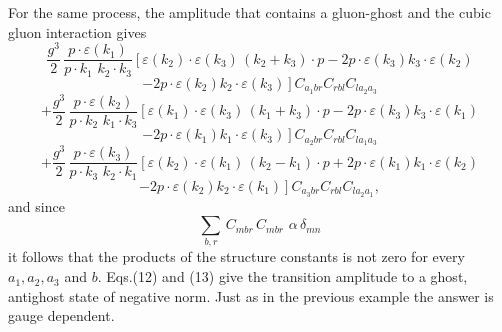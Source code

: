 \documentclass[a4paper,12pt]{article}
\begin{document}
For the same process, the amplitude that contains a gluon-ghost and the cubic gluon interaction gives
\begin{displaymath}
\frac{g^{3}}{2} \, \frac{p \cdot \varepsilon(k_{1})}{p \cdot k_{1} \,\, k_{2} \cdot k_{3}} \left[ \varepsilon(k_{2}) \cdot \varepsilon(k_{3}) \, (k_{2} + k_{3}) \cdot p - 2 p \cdot \varepsilon(k_{3}) k_{3} \cdot \varepsilon (k_{2})
\right .
\end{displaymath}
\begin{displaymath}
\left .
- 2p \cdot \varepsilon(k_{2}) k_{2} \cdot \varepsilon(k_{3}) \right] C_{a_{1}br} C_{rbl} C_{la_{2}a_{3}}
\end{displaymath}
\begin{displaymath}
+ \frac{g^{3}}{2} \, \frac{p \cdot \varepsilon(k_{2})}{p \cdot k_{2} \,\, k_{1} \cdot k_{3}} \left[ \varepsilon(k_{1}) \cdot \varepsilon(k_{3}) \, (k_{1} + k_{3}) \cdot p - 2 p \cdot \varepsilon(k_{3}) k_{3} \cdot \varepsilon (k_{1})
\right .
\end{displaymath}
\begin{displaymath}
\left .
- 2p \cdot \varepsilon(k_{1}) k_{1} \cdot \varepsilon(k_{3}) \right] C_{a_{2}br} C_{rbl} C_{la_{1}a_{3}}
\end{displaymath}
\begin{displaymath}
+ \frac{g^{3}}{2} \, \frac{p \cdot \varepsilon(k_{3})}{p \cdot k_{3} \,\, k_{2} \cdot k_{1}} \left[ \varepsilon(k_{2}) \cdot \varepsilon(k_{1}) \, (k_{2} - k_{1}) \cdot p + 2 p \cdot \varepsilon(k_{1}) k_{1} \cdot \varepsilon (k_{2})
\right .
\end{displaymath}
\begin{equation}
\left .
- 2p \cdot \varepsilon(k_{2}) k_{2} \cdot \varepsilon(k_{1}) \right] C_{a_{3}br} C_{rbl} C_{la_{2}a_{1}},
\end{equation}
and since
\begin{equation}
\sum_{b,r} \, C_{mbr} \, C_{mbr} \, \, \alpha \, \delta_{mn}
\end{equation}
it follows that the products of the structure constants is not zero for every $a_{1}, a_{2}, a_{3}$ and $b$.  Eqs.(12) and (13) give the transition amplitude to a ghost, antighost state of negative norm.  Just as in the previous example the answer is gauge dependent.
\end{document}

